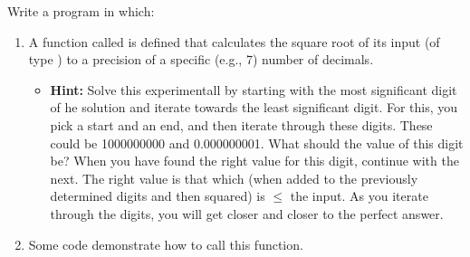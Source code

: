 Write a program in which:
\begin{enumerate}
  \item A function called  is defined that calculates the square root of its input (of type ) to a precision of a specific (e.g., 7) number of decimals.
    \begin{itemize}
      \item \textbf{Hint:} Solve this experimentall by starting with the most significant digit of he solution and iterate towards the least significant digit. For this, you pick a start and an end, and then iterate through these digits. These could be 1000000000 and 0.000000001. What should the value of this digit be? When you have found the right value for this digit, continue with the next. The right value is that which (when added to the previously determined digits and then squared) is $\leq$ the input. As you iterate through the digits, you will get closer and closer to the perfect answer.
    \end{itemize}
  \item Some code demonstrate how to call this function.
\end{enumerate}
